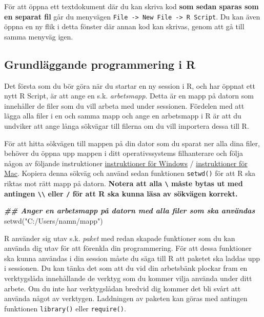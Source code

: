 \documentclass[
]{book}
\newenvironment{Shaded}{\begin{snugshade}}{\end{snugshade}}
\newcommand{\DocumentationTok}[1]{\textcolor[rgb]{0.56,0.35,0.01}{\textbf{\textit{#1}}}}
\newcommand{\FunctionTok}[1]{\textcolor[rgb]{0.00,0.00,0.00}{#1}}
\newcommand{\NormalTok}[1]{#1}
\newcommand{\StringTok}[1]{\textcolor[rgb]{0.31,0.60,0.02}{#1}}
\theoremstyle{definition}
\theoremstyle{definition}
\theoremstyle{definition}
\theoremstyle{definition}
\theoremstyle{remark}
\begin{document}
För att öppna ett textdokument där du kan skriva kod \textbf{som sedan sparas som en separat fil} går du menyvägen \texttt{File\ -\textgreater{}\ New\ File\ -\textgreater{}\ R\ Script}. Du kan även öppna en ny flik i detta fönster där annan kod kan skrivas, genom att gå till samma menyväg igen.

\hypertarget{basic_R}{%
\subsection{Grundläggande programmering i R}\label{basic_R}}

Det första som du bör göra när du startar en ny session i R, och har öppnat ett nytt R Script, är att ange en s.k. \emph{arbetsmapp}. Detta är en mapp på datorn som innehåller de filer som du vill arbeta med under sessionen. Fördelen med att lägga alla filer i en och samma mapp och ange en arbetsmapp i R är att du undviker att ange långa sökvägar till filerna om du vill importera dessa till R.

För att hitta sökvägen till mappen på din dator som du sparat ner alla dina filer, behöver du öppna upp mappen i ditt operativssystems filhanterare och följa någon av följande instruktioner \href{https://www.top-password.com/blog/tag/how-to-find-file-path-windows-10/}{instruktioner för Windows} / \href{http://osxdaily.com/2013/06/19/copy-file-folder-path-mac-os-x/}{instruktioner för Mac}. Kopiera denna sökväg och använd sedan funktionen \texttt{setwd()} för att R ska riktas mot rätt mapp på datorn. \textbf{Notera att alla \texttt{\textbackslash{}} måste bytas ut med antingen \texttt{\textbackslash{}\textbackslash{}} eller \texttt{/} för att R ska kunna läsa av sökvägen korrekt.}

\begin{Shaded}
\begin{Highlighting}[]
\DocumentationTok{\#\# Anger en arbetsmapp på datorn med alla filer som ska användas }
\FunctionTok{setwd}\NormalTok{(}\StringTok{"C:/Users/namn/mapp"}\NormalTok{)}
\end{Highlighting}
\end{Shaded}

R använder sig utav s.k. \emph{paket} med redan skapade funktioner som du kan använda dig utav för att förenkla din programmering. För att dessa funktioner ska kunna användas i din session måste du säga till R att paketet ska laddas upp i sessionen. Du kan tänka det som att du vid din arbetsbänk plockar fram en verktygslåda innehållande de verktyg som du kommer vilja använda under ditt arbete. Om du inte har verktygslådan bredvid dig kommer det bli svårt att använda något av verktygen. Laddningen av paketen kan göras med antingen funktionen \texttt{library()} eller \texttt{require()}.
\end{document}
